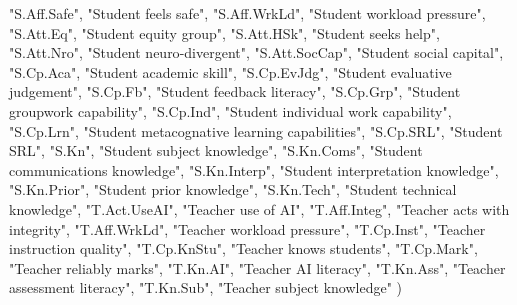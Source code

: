 \documentclass[
  letterpaper,
  DIV=11,
  numbers=noendperiod]{scrartcl}
\newenvironment{Shaded}{\begin{snugshade}}{\end{snugshade}}
\newcommand{\NormalTok}[1]{\textcolor[rgb]{0.00,0.23,0.31}{#1}}
\newcommand{\StringTok}[1]{\textcolor[rgb]{0.13,0.47,0.30}{#1}}
\begin{document}
\begin{Shaded}
\begin{Highlighting}[]
    \StringTok{"S.Aff.Safe"}\NormalTok{, }\StringTok{"Student feels safe"}\NormalTok{,}
    \StringTok{"S.Aff.WrkLd"}\NormalTok{, }\StringTok{"Student workload pressure"}\NormalTok{,}
    \StringTok{"S.Att.Eq"}\NormalTok{, }\StringTok{"Student equity group"}\NormalTok{,}
    \StringTok{"S.Att.HSk"}\NormalTok{, }\StringTok{"Student seeks help"}\NormalTok{,}
    \StringTok{"S.Att.Nro"}\NormalTok{, }\StringTok{"Student neuro{-}divergent"}\NormalTok{,}
    \StringTok{"S.Att.SocCap"}\NormalTok{, }\StringTok{"Student social capital"}\NormalTok{,}
    \StringTok{"S.Cp.Aca"}\NormalTok{, }\StringTok{"Student academic skill"}\NormalTok{,}
    \StringTok{"S.Cp.EvJdg"}\NormalTok{, }\StringTok{"Student evaluative judgement"}\NormalTok{,}
    \StringTok{"S.Cp.Fb"}\NormalTok{, }\StringTok{"Student feedback literacy"}\NormalTok{,}
    \StringTok{"S.Cp.Grp"}\NormalTok{, }\StringTok{"Student groupwork capability"}\NormalTok{,}
    \StringTok{"S.Cp.Ind"}\NormalTok{, }\StringTok{"Student individual work capability"}\NormalTok{,}
    \StringTok{"S.Cp.Lrn"}\NormalTok{, }\StringTok{"Student metacognative learning capabilities"}\NormalTok{,}
    \StringTok{"S.Cp.SRL"}\NormalTok{, }\StringTok{"Student SRL"}\NormalTok{,}
    \StringTok{"S.Kn"}\NormalTok{, }\StringTok{"Student subject knowledge"}\NormalTok{,}
    \StringTok{"S.Kn.Coms"}\NormalTok{, }\StringTok{"Student communications knowledge"}\NormalTok{,}
    \StringTok{"S.Kn.Interp"}\NormalTok{, }\StringTok{"Student interpretation knowledge"}\NormalTok{,}
    \StringTok{"S.Kn.Prior"}\NormalTok{, }\StringTok{"Student prior knowledge"}\NormalTok{,}
    \StringTok{"S.Kn.Tech"}\NormalTok{, }\StringTok{"Student technical knowledge"}\NormalTok{,}
    \StringTok{"T.Act.UseAI"}\NormalTok{, }\StringTok{"Teacher use of AI"}\NormalTok{,}
    \StringTok{"T.Aff.Integ"}\NormalTok{, }\StringTok{"Teacher acts with integrity"}\NormalTok{,}
    \StringTok{"T.Aff.WrkLd"}\NormalTok{, }\StringTok{"Teacher workload pressure"}\NormalTok{,}
    \StringTok{"T.Cp.Inst"}\NormalTok{, }\StringTok{"Teacher instruction quality"}\NormalTok{,}
    \StringTok{"T.Cp.KnStu"}\NormalTok{, }\StringTok{"Teacher knows students"}\NormalTok{,}
    \StringTok{"T.Cp.Mark"}\NormalTok{, }\StringTok{"Teacher reliably marks"}\NormalTok{,}
    \StringTok{"T.Kn.AI"}\NormalTok{, }\StringTok{"Teacher AI literacy"}\NormalTok{,}
    \StringTok{"T.Kn.Ass"}\NormalTok{, }\StringTok{"Teacher assessment literacy"}\NormalTok{,}
    \StringTok{"T.Kn.Sub"}\NormalTok{, }\StringTok{"Teacher subject knowledge"}
\NormalTok{)}


\end{Highlighting}
\end{Shaded}
\end{document}
